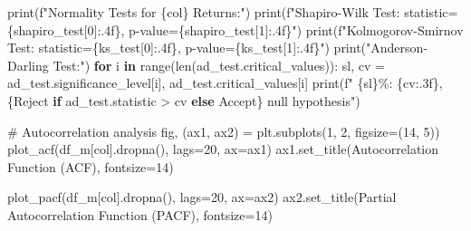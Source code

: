 \documentclass[
  letterpaper,
  DIV=11,
  numbers=noendperiod]{scrartcl}
\newenvironment{Shaded}{\begin{snugshade}}{\end{snugshade}}
\newcommand{\BuiltInTok}[1]{\textcolor[rgb]{0.00,0.23,0.31}{#1}}
\newcommand{\CommentTok}[1]{\textcolor[rgb]{0.37,0.37,0.37}{#1}}
\newcommand{\ControlFlowTok}[1]{\textcolor[rgb]{0.00,0.23,0.31}{\textbf{#1}}}
\newcommand{\DecValTok}[1]{\textcolor[rgb]{0.68,0.00,0.00}{#1}}
\newcommand{\KeywordTok}[1]{\textcolor[rgb]{0.00,0.23,0.31}{\textbf{#1}}}
\newcommand{\NormalTok}[1]{\textcolor[rgb]{0.00,0.23,0.31}{#1}}
\newcommand{\OperatorTok}[1]{\textcolor[rgb]{0.37,0.37,0.37}{#1}}
\newcommand{\SpecialCharTok}[1]{\textcolor[rgb]{0.37,0.37,0.37}{#1}}
\newcommand{\SpecialStringTok}[1]{\textcolor[rgb]{0.13,0.47,0.30}{#1}}
\newcommand{\StringTok}[1]{\textcolor[rgb]{0.13,0.47,0.30}{#1}}
\begin{document}
\begin{Shaded}
\begin{Highlighting}[]
    \BuiltInTok{print}\NormalTok{(}\SpecialStringTok{f"Normality Tests for }\SpecialCharTok{\{}\NormalTok{col}\SpecialCharTok{\}}\SpecialStringTok{ Returns:"}\NormalTok{)}
    \BuiltInTok{print}\NormalTok{(}\SpecialStringTok{f"Shapiro{-}Wilk Test: statistic=}\SpecialCharTok{\{}\NormalTok{shapiro\_test[}\DecValTok{0}\NormalTok{]}\SpecialCharTok{:.4f\}}\SpecialStringTok{, p{-}value=}\SpecialCharTok{\{}\NormalTok{shapiro\_test[}\DecValTok{1}\NormalTok{]}\SpecialCharTok{:.4f\}}\SpecialStringTok{"}\NormalTok{)}
    \BuiltInTok{print}\NormalTok{(}\SpecialStringTok{f"Kolmogorov{-}Smirnov Test: statistic=}\SpecialCharTok{\{}\NormalTok{ks\_test[}\DecValTok{0}\NormalTok{]}\SpecialCharTok{:.4f\}}\SpecialStringTok{, p{-}value=}\SpecialCharTok{\{}\NormalTok{ks\_test[}\DecValTok{1}\NormalTok{]}\SpecialCharTok{:.4f\}}\SpecialStringTok{"}\NormalTok{)}
    \BuiltInTok{print}\NormalTok{(}\StringTok{"Anderson{-}Darling Test:"}\NormalTok{)}
    \ControlFlowTok{for}\NormalTok{ i }\KeywordTok{in} \BuiltInTok{range}\NormalTok{(}\BuiltInTok{len}\NormalTok{(ad\_test.critical\_values)):}
\NormalTok{        sl, cv }\OperatorTok{=}\NormalTok{ ad\_test.significance\_level[i], ad\_test.critical\_values[i]}
        \BuiltInTok{print}\NormalTok{(}\SpecialStringTok{f"    }\SpecialCharTok{\{}\NormalTok{sl}\SpecialCharTok{\}}\SpecialStringTok{\%: }\SpecialCharTok{\{}\NormalTok{cv}\SpecialCharTok{:.3f\}}\SpecialStringTok{, }\SpecialCharTok{\{}\StringTok{\textquotesingle{}Reject\textquotesingle{}} \ControlFlowTok{if}\NormalTok{ ad\_test}\SpecialCharTok{.}\NormalTok{statistic }\OperatorTok{\textgreater{}}\NormalTok{ cv }\ControlFlowTok{else} \StringTok{\textquotesingle{}Accept\textquotesingle{}}\SpecialCharTok{\}}\SpecialStringTok{ null hypothesis"}\NormalTok{)}
    
    \CommentTok{\# Autocorrelation analysis}
\NormalTok{    fig, (ax1, ax2) }\OperatorTok{=}\NormalTok{ plt.subplots(}\DecValTok{1}\NormalTok{, }\DecValTok{2}\NormalTok{, figsize}\OperatorTok{=}\NormalTok{(}\DecValTok{14}\NormalTok{, }\DecValTok{5}\NormalTok{))}
\NormalTok{    plot\_acf(df\_m[col].dropna(), lags}\OperatorTok{=}\DecValTok{20}\NormalTok{, ax}\OperatorTok{=}\NormalTok{ax1)}
\NormalTok{    ax1.set\_title(}\StringTok{\textquotesingle{}Autocorrelation Function (ACF)\textquotesingle{}}\NormalTok{, fontsize}\OperatorTok{=}\DecValTok{14}\NormalTok{)}

\NormalTok{    plot\_pacf(df\_m[col].dropna(), lags}\OperatorTok{=}\DecValTok{20}\NormalTok{, ax}\OperatorTok{=}\NormalTok{ax2)}
\NormalTok{    ax2.set\_title(}\StringTok{\textquotesingle{}Partial Autocorrelation Function (PACF)\textquotesingle{}}\NormalTok{, fontsize}\OperatorTok{=}\DecValTok{14}\NormalTok{)}


\end{Highlighting}
\end{Shaded}
\end{document}
